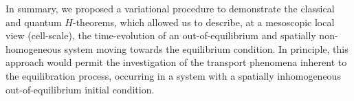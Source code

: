 In summary, we proposed a variational procedure to demonstrate the classical and
quantum $H$-theorems, which allowed us to describe, at a mesoscopic local view
(cell-scale), the time-evolution of an out-of-equilibrium and spatially
non-homogeneous system moving towards the equilibrium condition. In principle, this
approach would permit the investigation of the transport phenomena inherent to the
equilibration process, occurring in a system with a spatially inhomogeneous
out-of-equilibrium initial condition. 

